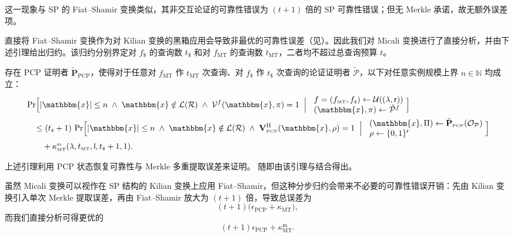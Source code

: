 \documentclass[american,singlepageview]{snargs-book-zh}
\newcommand{\Bits}{\{0,1\}}
\newcommand{\Malicious}[1]{\tilde{#1}}
\newcommand{\BlackBox}[1]{\mathcal{O}_{#1}}
\newcommand{\StateExperiment}[1]{
\!\begin{array}{l}
#1
\end{array}\!}
\newcommand{\SomeSize}[1]{|#1|}
\newcommand{\Naturals}{\mathbb{N}}
\newcommand{\Relation}{\mathcal{R}}
\newcommand{\Language}{\mathcal{L}}
\newcommand{\GetLanguage}[1]{\Language(#1)}
\newcommand{\Instance}{\mathbbm{x}}
\newcommand{\InstanceSize}{n}
\newcommand{\ProtoProver}{P}
\newcommand{\ProtoVerifier}{V}
\newcommand{\ProtoSoundnessError}{\epsilon}
\newcommand{\ProtoKnowledgeError}{\kappa}
\newcommand{\ProtoProofLength}{\mathsf{l}}
\newcommand{\ProtoRandomnessComplexity}{\mathsf{r}}
\newcommand{\PCPSubscript}{\scriptscriptstyle\mathrm{PCP}}
\newcommand{\PCPFormat}[1]{\mathbf{#1}}
\newcommand{\PCPVerifier}{\PCPFormat{\ProtoVerifier}_{\PCPSubscript}}
\newcommand{\PCPMaliciousProver}{\Malicious{\PCPFormat{\ProtoProver}}_{\PCPSubscript}}
\newcommand{\PCPString}{\Pi}
\newcommand{\PCPVerifierRandomMessage}{\rho}
\newcommand{\PCPSoundnessError}{\ProtoSoundnessError_{\PCPSubscript}}
\newcommand{\PCPProofLength}{\ProtoProofLength}
\newcommand{\PCPRandomnessComplexity}{\ProtoRandomnessComplexity}
\newcommand{\ARGFormat}[1]{\mathcal{#1}}
\newcommand{\ARGProver}{\ARGFormat{\ProtoProver}}
\newcommand{\ARGVerifier}{\ARGFormat{\ProtoVerifier}}
\newcommand{\ARGString}{\pi}
\newcommand{\ROFunction}{f}
\newcommand{\ROQueryBound}{t}
\newcommand{\RODistribution}[1]{\mathcal{U}(#1)}
\newcommand{\SecurityParameter}{\lambda}
\newcommand{\ROTreeSymbol}{\MTSubscript}
\newcommand{\RORandSymbol}{\scriptscriptstyle \mathsf{\$}}
\newcommand{\ROTreeFunction}{\ROFunction_{\ROTreeSymbol}}
\newcommand{\RORandFunction}{\ROFunction_{\RORandSymbol}}
\newcommand{\ROTreeQueryBound}{\ROQueryBound_{\ROTreeSymbol}}
\newcommand{\RORandQueryBound}{\ROQueryBound_{\RORandSymbol}}
\newcommand{\MTSubscript}{{\scriptscriptstyle\mathrm{MT}}}
\newcommand{\MTMultiSymbol}{\scriptscriptstyle{\mathrm{m}}}
\newcommand{\MTExtractionError}{\ProtoKnowledgeError_{\MTSubscript}}
\newcommand{\MTMultiExtractionError}{\ProtoKnowledgeError_{\MTSubscript}^{\MTMultiSymbol}}
\begin{document}
这一现象与 SP 的 Fiat--Shamir 变换类似，其非交互论证的可靠性错误为 $(\ROQueryBound+1)$ 倍的 SP 可靠性错误；但无 Merkle 承诺，故无额外误差项。

直接将 Fiat--Shamir 变换作为对 Kilian 变换的黑箱应用会导致非最优的可靠性误差（见）。因此我们对 Micali 变换进行了直接分析，并由下述引理给出归约。该归约分别界定对 $\RORandFunction$ 的查询数 $\RORandQueryBound$ 和对 $\ROTreeFunction$ 的查询数 $\ROTreeQueryBound$，二者均不超过总查询预算 $\ROQueryBound$。

\begin{lemma}
\label{lemma:micali-adaptive-reduction}
存在 PCP 证明者 $\PCPMaliciousProver$，使得对于任意对 $\ROTreeFunction$ 作 $\ROTreeQueryBound$ 次查询、对 $\RORandFunction$ 作 $\RORandQueryBound$ 次查询的论证证明者 $\Malicious{\ARGProver}$，以下对任意实例规模上界 $\InstanceSize\in\Naturals$ 均成立：
\begin{align*}
&\Pr\Bigl[
  \SomeSize{\Instance}\le\InstanceSize
  \;\land\;
  \Instance\notin\GetLanguage{\Relation}
  \;\land\;
  \ARGVerifier^{\ROFunction}(\Instance,\ARGString)=1
  \;\Bigm|\;
  \StateExperiment{
    \ROFunction=(\ROTreeFunction,\RORandFunction)\gets\RODistribution{(\SecurityParameter,\PCPRandomnessComplexity)}\\
    (\Instance,\ARGString)\gets\Malicious{\ARGProver}^{\ROFunction}
  }
\Bigr]\\
&\quad\le
(\RORandQueryBound+1)\,
\Pr\Bigl[
  \SomeSize{\Instance}\le\InstanceSize
  \;\land\;
  \Instance\notin\GetLanguage{\Relation}
  \;\land\;
  \PCPVerifier^{\PCPString}(\Instance,\PCPVerifierRandomMessage)=1
  \;\Bigm|\;
  \StateExperiment{
    (\Instance,\PCPString)\gets\PCPMaliciousProver(\BlackBox{\ARGProver})\\
    \PCPVerifierRandomMessage\gets\Bits^{\PCPRandomnessComplexity}
  }
\Bigr]\\
&\quad\quad
+
\MTMultiExtractionError(\SecurityParameter,\ROTreeQueryBound,\PCPProofLength,\RORandQueryBound+1,1).
\end{align*}
\end{lemma}

上述引理利用 PCP 状态恢复可靠性与 Merkle 多重提取误差来证明。 随即由该引理与结合得出。

\begin{remark}
\label{remark:micali-from-fs-applied-to-killian}
虽然 Micali 变换可以视作在 SP 结构的 Kilian 变换上应用 Fiat--Shamir，但这种分步归约会带来不必要的可靠性错误开销：先由 Kilian 变换引入单次 Merkle 提取误差，再由 Fiat--Shamir 放大为 $(\ROQueryBound+1)$ 倍，导致总误差为
\[
(\ROQueryBound+1)\bigl(\PCPSoundnessError+\MTExtractionError\bigr),
\]
而我们直接分析可得更优的
\[
(\ROQueryBound+1)\PCPSoundnessError
+
\MTMultiExtractionError.
\]
\end{remark}
\end{document}
